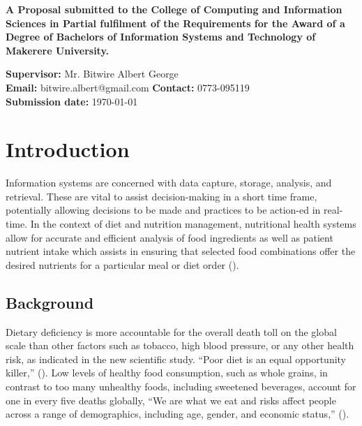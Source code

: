 \documentclass{article}
\begin{document}
\begin{center}
\begin{center}
\textbf{A Proposal submitted to the College of Computing and Information Sciences in Partial fulfilment of the Requirements for the Award of a Degree of Bachelors of Information Systems and Technology of Makerere University.}
\end{center}

\vspace{60pt} 
\textbf{Supervisor:} Mr. Bitwire Albert George \\
\textbf{Email:} bitwire.albert@gmail.com \hspace{1cm} \textbf{Contact:} 0773-095119 \\
\textbf{Submission date:} \today

\end{center}

\newpage
\tableofcontents
\newpage

\section{Introduction}
\label{Introducion}
Information systems are concerned with data capture, storage, analysis, and retrieval. These are vital to assist decision-making in a short time frame, potentially allowing decisions to be made and practices to be action-ed in real-time.  In the context of diet and nutrition management, nutritional health systems allow for accurate and efficient analysis of food ingredients as well as patient nutrient intake which assists in ensuring that selected food combinations offer the desired nutrients for a particular meal or diet order (\cite{DFM}). 


\subsection{Background}
Dietary deficiency is more accountable for the overall death toll on the global scale than other factors such as tobacco, high blood pressure, or any other health risk, as indicated in the new scientific study. “Poor diet is an equal opportunity killer,” (\cite{ihme2019new}). Low levels of healthy food consumption, such as whole grains, in contrast to too many unhealthy foods, including sweetened beverages, account for one in every five deaths globally, “We are what we eat and risks affect people across a range of demographics, including age, gender, and economic status,” (\cite{ihme2019new}).
\end{document}
